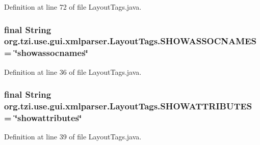 Definition at line 72 of file Layout\-Tags.\-java.

\hypertarget{classorg_1_1tzi_1_1use_1_1gui_1_1xmlparser_1_1_layout_tags_abd292dd8878b42c1fe3d0148a47f35a4}{
\subsubsection[{S\-H\-O\-W\-A\-S\-S\-O\-C\-N\-A\-M\-E\-S}]{\setlength{\rightskip}{0pt plus 5cm}final String org.\-tzi.\-use.\-gui.\-xmlparser.\-Layout\-Tags.\-S\-H\-O\-W\-A\-S\-S\-O\-C\-N\-A\-M\-E\-S = \char`\"{}showassocnames\char`\"{}\hspace{0.3cm}{\ttfamily [static]}}}\label{classorg_1_1tzi_1_1use_1_1gui_1_1xmlparser_1_1_layout_tags_abd292dd8878b42c1fe3d0148a47f35a4}


Definition at line 36 of file Layout\-Tags.\-java.

\hypertarget{classorg_1_1tzi_1_1use_1_1gui_1_1xmlparser_1_1_layout_tags_a62e1622f667ce26b542f85aab8d1b5af}{
\subsubsection[{S\-H\-O\-W\-A\-T\-T\-R\-I\-B\-U\-T\-E\-S}]{\setlength{\rightskip}{0pt plus 5cm}final String org.\-tzi.\-use.\-gui.\-xmlparser.\-Layout\-Tags.\-S\-H\-O\-W\-A\-T\-T\-R\-I\-B\-U\-T\-E\-S = \char`\"{}showattributes\char`\"{}\hspace{0.3cm}{\ttfamily [static]}}}\label{classorg_1_1tzi_1_1use_1_1gui_1_1xmlparser_1_1_layout_tags_a62e1622f667ce26b542f85aab8d1b5af}


Definition at line 39 of file Layout\-Tags.\-java.

